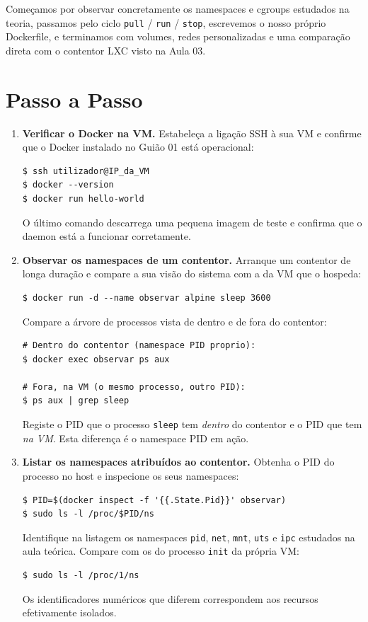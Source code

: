 \documentclass[11pt,a4paper]{article}
\begin{document}
Começamos por observar concretamente os namespaces e cgroups estudados na teoria, passamos pelo ciclo \texttt{pull} / \texttt{run} / \texttt{stop}, escrevemos o nosso próprio Dockerfile, e terminamos com volumes, redes personalizadas e uma comparação direta com o contentor LXC visto na Aula 03.

\section{Passo a Passo}
\begin{enumerate}[label=\arabic*.]

  \item \textbf{Verificar o Docker na VM.} Estabeleça a ligação SSH à sua VM e confirme que o Docker instalado no Guião 01 está operacional:
\begin{lstlisting}
$ ssh utilizador@IP_da_VM
$ docker --version
$ docker run hello-world
\end{lstlisting}
  O último comando descarrega uma pequena imagem de teste e confirma que o daemon está a funcionar corretamente.

  \item \textbf{Observar os namespaces de um contentor.} Arranque um contentor de longa duração e compare a sua visão do sistema com a da VM que o hospeda:
\begin{lstlisting}
$ docker run -d --name observar alpine sleep 3600
\end{lstlisting}
  Compare a árvore de processos vista de dentro e de fora do contentor:
\begin{lstlisting}
# Dentro do contentor (namespace PID proprio):
$ docker exec observar ps aux

# Fora, na VM (o mesmo processo, outro PID):
$ ps aux | grep sleep
\end{lstlisting}
  Registe o PID que o processo \texttt{sleep} tem \emph{dentro} do contentor e o PID que tem \emph{na VM}. Esta diferença é o namespace PID em ação.

  \item \textbf{Listar os namespaces atribuídos ao contentor.} Obtenha o PID do processo no host e inspecione os seus namespaces:
\begin{lstlisting}
$ PID=$(docker inspect -f '{{.State.Pid}}' observar)
$ sudo ls -l /proc/$PID/ns
\end{lstlisting}
  Identifique na listagem os namespaces \texttt{pid}, \texttt{net}, \texttt{mnt}, \texttt{uts} e \texttt{ipc} estudados na aula teórica. Compare com os do processo \texttt{init} da própria VM:
\begin{lstlisting}
$ sudo ls -l /proc/1/ns
\end{lstlisting}
  Os identificadores numéricos que diferem correspondem aos recursos efetivamente isolados.


\end{enumerate}
\end{document}
